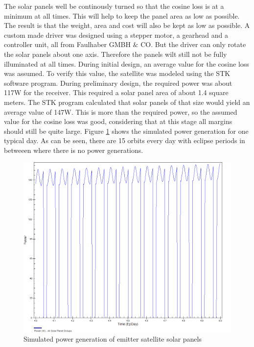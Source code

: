 The solar panels well be continously turned so that the cosine loss is at a minimum at all times. This will help to keep the panel area as low as possible. The result is that the weight, area and cost will also be kept as low as possible. A custom made driver was designed using a stepper motor, a gearhead and a controller unit, all from Faulhaber GMBH $\&$ CO. But the driver can only rotate the solar panels about one axis. Therefore the panels wilt still not be fully illuminated at all times. During initial design, an average value for the cosine loss was assumed. To verify this value, the satellite was modeled using the STK software program. During preliminary design, the required power was about 117W for the receiver. This required a solar panel area of about 1.4 square meters. The STK program calculated that solar panels of that size would yield an average value of 147W. This is more than the required power, so the assumed value for the cosine loss was good, considering that at this stage all margins should still be quite large.  Figure \ref{fig:powersim} shows the simulated power generation for one typical day. As can be seen, there are 15 orbits every day with eclipse periods in betweeen where there is no power generations.

\begin{figure}[H!]
\centering
\includegraphics{img/powerSim.png}
\caption{Simulated power generation of emitter satellite solar panels}
\label{fig:powersim}
\end{figure}

